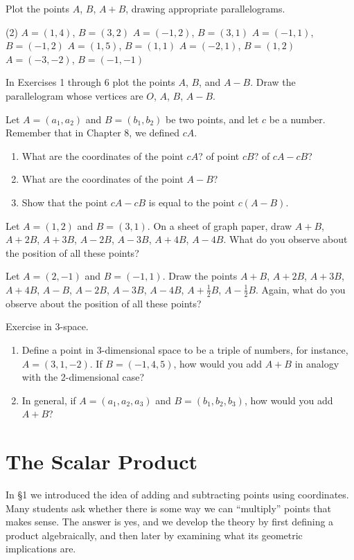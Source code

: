 \documentclass[12pt]{book} %
\begin{document}
\setcounter{Exercise}{0}
\begin{ExerciseList}
\Exercise Plot the points $A$, $B$, $A+B$, drawing appropriate parallelograms.
\begin{tasks}(2)
\task[(1)] $A=(1,4)$, $B=(3,2)$
\task[(2)] $A=(-1,2)$, $B=(3,1)$
\task[(3)] $A=(-1,1)$, $B=(-1,2)$
\task[(4)] $A=(1,5)$, $B=(1,1)$
\task[(5)] $A=(-2,1)$, $B=(1,2)$
\task[(6)] $A=(-3,-2)$, $B=(-1,-1)$
\end{tasks}

\Exercise In Exercises 1 through 6 plot the points $A$, $B$, and $A-B$. Draw the parallelogram whose vertices are $O$, $A$, $B$, $A-B$.

\Exercise Let $A=(a_1,a_2)$ and $B=(b_1,b_2)$ be two points, and let $c$ be a number. Remember that in Chapter 8, we defined $cA$.
\begin{enumerate}
\item[(a)] What are the coordinates of the point $cA$? of point $cB$? of $cA-cB$?
\item[(b)] What are the coordinates of the point $A-B$?
\item[(c)] Show that the point $cA-cB$ is equal to the point $c(A-B)$.
\end{enumerate}

\Exercise Let $A=(1,2)$ and $B=(3,1)$. On a sheet of graph paper, draw $A+B$, $A+2B$, $A+3B$, $A-2B$, $A-3B$, $A+4B$, $A-4B$. What do you observe about the position of all these points?

\Exercise Let $A=(2,-1)$ and $B=(-1,1)$. Draw the points $A+B$, $A+2B$, $A+3B$, $A+4B$, $A-B$, $A-2B$, $A-3B$, $A-4B$, $A+\frac12 B$, $A-\frac12 B$. Again, what do you observe about the position of all these points?

\Exercise Exercise in 3-space.
\begin{enumerate}
\item[(a)] Define a point in 3-dimensional space to be a triple of numbers, for instance, $A=(3,1,-2)$. If $B=(-1,4,5)$, how would you add $A+B$ in analogy with the 2-dimensional case?
\item[(b)] In general, if $A=(a_1,a_2,a_3)$ and $B=(b_1,b_2,b_3)$, how would you add $A+B$?
\end{enumerate}

\section{The Scalar Product}

In \S1 we introduced the idea of adding and subtracting points using coordinates. Many students ask whether there is some way we can ``multiply'' points that makes sense. The answer is yes, and we develop the theory by first defining a product algebraically, and then later by examining what its geometric implications are.


\end{ExerciseList}
\end{document}
